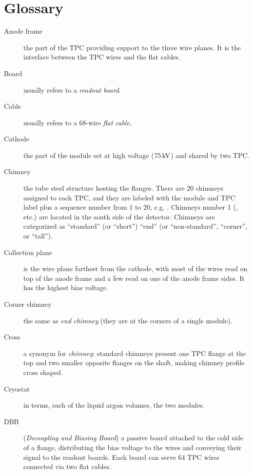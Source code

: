 \section{Glossary}
\label{sec:glossary}

\begin{description}

  \item[Anode frame]
    the part of the TPC providing support to the three wire
    planes. It is the interface between the TPC wires and the flat cables.

  \item[Board]
    usually refers to a \emph{readout board}.

  \item[Cable]
    usually refers to a 68-wire \emph{flat cable}.

  \item[Cathode]
    the part of the module set at high voltage ($75\,\textnormal{kV}$)
    and shared by two TPC.

  \item[Chimney]
    the tube steel structure hosting the flanges. There are 20 chimneys assigned
    to each TPC, and they are labeled with the module and TPC label plus a
    sequence number from 1 to 20, e.g. . Chimneys number 1
    (,  etc.) are located in the south side of the
    detector. Chimneys are categorized as ``standard'' (or ``short'')
    ``end'' (or ``non-standard'', ``corner'', or ``tall'').

  \item[Collection plane]
    is the wire plane farthest from the cathode,
    with most of the wires read on top of the anode frame and a few read on one
    of the anode frame sides. It has the highest bias voltage.

  \item[Corner chimney]
    the same as \emph{end chimney} (they are at the corners of a single module).

  \item[Cross]
    a synonym for \emph{chimney}: standard chimneys present one TPC flange at
    the top and two smaller opposite flanges on the shaft, making chimney
    profile cross shaped.

  \item[Cryostat]
    in \LArSoft terms, each of the liquid argon volumes, \ie the
    two modules.

  \item[DBB] (\emph{Decoupling and Biasing Board})
    a passive board attached
    to the cold side of a flange, distributing the bias voltage to the wires
    and conveying their signal to the readout boards. Each board can serve
    64 TPC wires connected via two flat cables.


\end{description}

